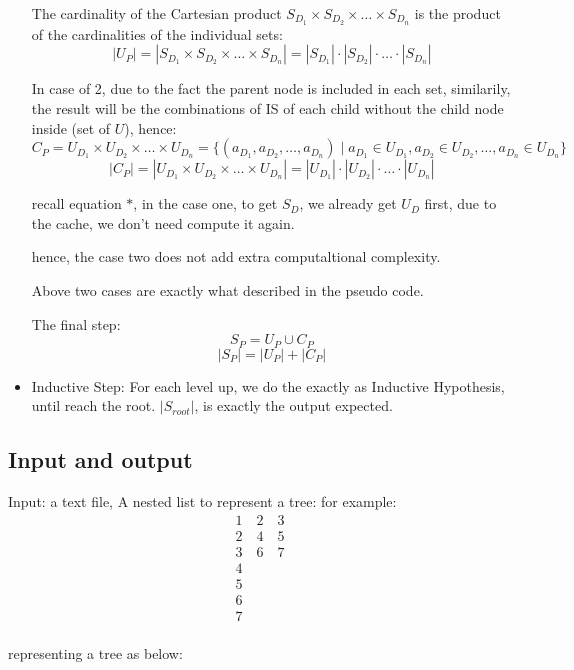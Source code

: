 \documentclass{article}
\begin{document}
\begin{itemize}
    The cardinality of the Cartesian product $S_{D_1} \times S_{D_2} \times \ldots \times S_{D_n}$ is the product of the cardinalities of the individual sets:
    \[|U_P| =|S_{D_1} \times S_{D_2} \times \ldots \times S_{D_n}| = |S_{D_1}| \cdot |S_{D_2}| \cdot \ldots \cdot |S_{D_n}| \]

    In case of 2, due to the fact the parent node is included in each set, similarily, 
    the result will be the combinations of IS of each child without the child node inside (set of $U$), hence:
    \[ C_P =  U_{D_1} \times U_{D_2} \times \ldots \times U_{D_n} = \{(a_{D_1}, a_{D_2}, \ldots, a_{D_n}) \mid a_{D_1} \in U_{D_1}, a_{D_2} \in U_{D_2}, \ldots, a_{D_n} \in U_{D_n}\} \]
    \[|C_P| =|U_{D_1} \times U_{D_2} \times \ldots \times U_{D_n}| = |U_{D_1}| \cdot |U_{D_2}| \cdot \ldots \cdot |U_{D_n}| \]

    recall equation $*$, in the case one, to get $S_{D}$, we already get $U_{D}$ first, due to the cache, we don't need compute it again. 

    hence, the case two does not add extra computaltional complexity.

    Above two cases are exactly what described in the pseudo code.
    
    The final step:
    \[ S_{P} =  U_{P} \cup C_{P} \] 
    \[ |S_{P}| =  |U_{P}| + |C_{P}| \] 



  \item Inductive Step: For each level up, we do the exactly as Inductive Hypothesis, until reach the root. $|S_{root}|$, is exactly the output expected.

  \end{itemize}


\subsection*{Input and output}
Input: a text file, 
A nested list to represent a tree:
for example:
\[
  \begin{array}{l}
1 \quad 2 \quad 3 \\
2 \quad 4 \quad 5 \\
3 \quad 6 \quad 7 \\
4 \\
5 \\
6 \\
7 \\
\end{array}
\]

representing a tree as below:
\end{document}
